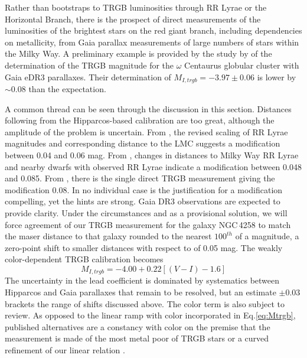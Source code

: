 \documentclass[twocolumn]{aastex63}
\begin{document}
Rather than bootstraps to TRGB luminosities through RR Lyrae or the Horizontal Branch, there is the prospect of direct measurements of the luminosities of the brightest stars on the red giant branch, including dependencies on metallicity, from Gaia parallax measurements of large numbers of stars within the Milky Way.  A preliminary example is provided by the study by \citet{2021ApJ...908L...5S} of the determination of the TRGB magnitude for the $\omega$ Centaurus globular cluster with Gaia eDR3 parallaxes.  Their determination of $M_{I,trgb} = -3.97\pm0.06$ is lower by $\sim 0.08$ than the \citet{2007ApJ...661..815R} expectation.

A common thread can be seen through the discussion in this section.  Distances following from the Hipparcos-based \citet{2007ApJ...661..815R} calibration are too great, although the amplitude of the problem is uncertain.  From \citet{2022MNRAS.513..788G}, the revised scaling of RR Lyrae magnitudes and corresponding distance to the LMC suggests a modification between 0.04 and 0.06 mag.  From \citet{2022ApJ...932...19N}, changes in distances to Milky Way RR Lyrae and nearby dwarfs with observed RR Lyrae indicate a modification between 0.048 and 0.085. From  \citet{2021ApJ...908L...5S}, there is the single direct TRGB measurement giving the modification 0.08.  In no individual case is the justification for a modification compelling, yet the hints are strong.  Gaia DR3 observations are expected to provide clarity.  Under the circumstances and as a provisional solution, we will force agreement of our TRGB measurement for the galaxy NGC\,4258 \citep{2022ApJ...932...15A} to match the maser distance to that galaxy \citep{2019ApJ...886L..27R} rounded to the nearest $100^{th}$ of a magnitude, a zero-point shift to smaller distances with respect to \citet{2007ApJ...661..815R} of 0.05 mag.  The weakly color-dependent TRGB calibration becomes
\begin{equation}
    M_{I,trgb} = -4.00 + 0.22 [(V-I) - 1.6]
    \label{eq:Mtrgb}
\end{equation}
The uncertainty in the lead coefficient is dominated by systematics between Hipparcos and Gaia parallaxes that remain to be resolved, but an estimate $\pm0.03$ brackets the range of shifts discussed above.  The color term is also subject to review.  As opposed to the linear ramp with color incorporated in Eq.\ref{eq:Mtrgb}, published alternatives are a constancy with color on the premise that the measurement is made of the most metal poor of TRGB stars \citep{2019ApJ...882...34F} or a curved refinement of our linear relation \citep{2017ApJ...835...28J}.
\end{document}
